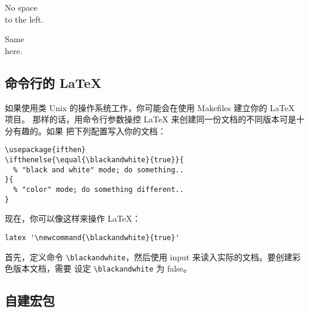 \begin{example}
\newenvironment{correct}%
 {\noindent\ignorespaces}%
 {\par\noindent%
   \ignorespacesafterend}

\begin{correct}
No space\\to the left.
\end{correct}
Same\\here.
\end{example}

\subsection{命令行的 \LaTeX}
如果使用类 Unix 的操作系统工作，你可能会在使用 Makefiles 建立你的 \LaTeX{} 项目。
那样的话，用命令行参数操控 \LaTeX{} 来创建同一份文档的不同版本可是十分有趣的。如果
把下列配置写入你的文档：
\begin{verbatim}
\usepackage{ifthen}
\ifthenelse{\equal{\blackandwhite}{true}}{
  % "black and white" mode; do something..
}{
  % "color" mode; do something different..
}
\end{verbatim}

现在，你可以像这样来操作 \LaTeX{}：
\begin{verbatim}
latex '\newcommand{\blackandwhite}{true}'
\end{verbatim}

首先，定义命令 \verb|\blackandwhite|，然后使用 input 来读入实际的文档。要创建彩色版本文档，需要
设定 \verb|\blackandwhite| 为 false。

\subsection{自建宏包}

